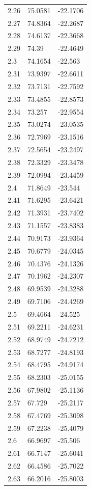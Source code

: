 \begin{table}
\begin{tabular}{lll}
2.26 & 75.0581 & -22.1706 \\
2.27 & 74.8364 & -22.2687 \\
2.28 & 74.6137 & -22.3668 \\
2.29 & 74.39 & -22.4649 \\
2.3 & 74.1654 & -22.563 \\
2.31 & 73.9397 & -22.6611 \\
2.32 & 73.7131 & -22.7592 \\
2.33 & 73.4855 & -22.8573 \\
2.34 & 73.257 & -22.9554 \\
2.35 & 73.0274 & -23.0535 \\
2.36 & 72.7969 & -23.1516 \\
2.37 & 72.5654 & -23.2497 \\
2.38 & 72.3329 & -23.3478 \\
2.39 & 72.0994 & -23.4459 \\
2.4 & 71.8649 & -23.544 \\
2.41 & 71.6295 & -23.6421 \\
2.42 & 71.3931 & -23.7402 \\
2.43 & 71.1557 & -23.8383 \\
2.44 & 70.9173 & -23.9364 \\
2.45 & 70.6779 & -24.0345 \\
2.46 & 70.4376 & -24.1326 \\
2.47 & 70.1962 & -24.2307 \\
2.48 & 69.9539 & -24.3288 \\
2.49 & 69.7106 & -24.4269 \\
2.5 & 69.4664 & -24.525 \\
2.51 & 69.2211 & -24.6231 \\
2.52 & 68.9749 & -24.7212 \\
2.53 & 68.7277 & -24.8193 \\
2.54 & 68.4795 & -24.9174 \\
2.55 & 68.2303 & -25.0155 \\
2.56 & 67.9802 & -25.1136 \\
2.57 & 67.729 & -25.2117 \\
2.58 & 67.4769 & -25.3098 \\
2.59 & 67.2238 & -25.4079 \\
2.6 & 66.9697 & -25.506 \\
2.61 & 66.7147 & -25.6041 \\
2.62 & 66.4586 & -25.7022 \\
2.63 & 66.2016 & -25.8003 \\

\end{tabular}
\end{table}

